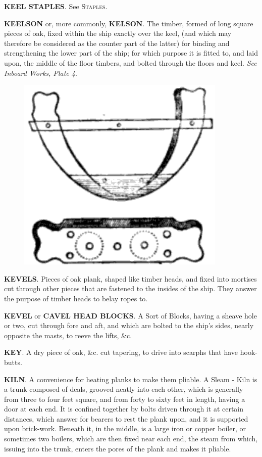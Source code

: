 \textbf{KEEL STAPLES}. See \textsc{Staples}. 

\textbf{KEELSON} or, more commonly, \textbf{KELSON}. The timber, formed of long square pieces of oak, fixed within the ship exactly over the keel, (and which may therefore be considered as the counter part of the latter) for binding and strengthening the lower part of the ship; for which purpose it is fitted to, and laid upon, the middle of the floor timbers, and bolted through the floors and keel. \textit{See Inboard Works, Plate 4}. 

\begin{figure}
\begin{center}
\includegraphics[scale=0.5]{pictures/kevels}
\end{center}
\end{figure}
\textbf{KEVELS}. Pieces of oak plank, shaped like timber heads, and fixed into mortises cut through other pieces that are fastened to the insides of the ship. They answer the purpose of timber heads to belay ropes to. 

\textbf{KEVEL} or \textbf{CAVEL HEAD BLOCKS}. A Sort of Blocks, having a sheave hole or two, cut through fore and aft, and which are bolted to the ship's sides, nearly opposite the masts, to reeve the lifts, \&c. 

\textbf{KEY}. A dry piece of oak, \&c. cut tapering, to drive into scarphs that have hook-butts.

\textbf{KILN}. A convenience for heating planks to make them pliable. A Sleam - Kiln is a trunk composed of deals, grooved neatly into each other, which is generally from three to four feet square, and from forty to sixty feet in length, having a door at each end. It is confined together by bolts driven through it at certain distances, which answer for bearers to rest the plank upon, and it is supported upon brick-work. Beneath it, in the middle, is a large iron or copper boiler, or sometimes two boilers, which are then fixed near each end, the steam from which, issuing into the trunk, enters the pores of the plank and makes it pliable. 

